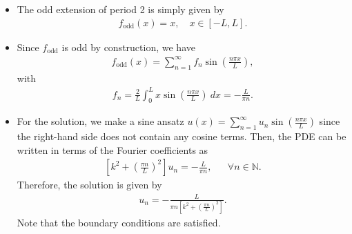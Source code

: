 \documentclass[11pt]{article}
\begin{document}
\begin{solution}
    \begin{itemize}
        \item The odd extension of period 2 is simply given by
        \begin{align*}
            f_{\mathrm{odd}}(x) = x, \quad x \in [-L,L].
        \end{align*}
        \item 
        Since $f_{\mathrm{odd}}$ is odd by construction, we have
        \begin{align*}
            f_{\mathrm{odd}}(x) = \sum_{n=1}^{\infty} f_n \sin(\frac{n \pi x}{L}),
        \end{align*}
        with
        \begin{align*}
            f_n = \frac{2}{L} \int_{0}^{L} x \sin(\frac{n \pi x}{L}) \ dx = -\frac{L}{\pi n}.
        \end{align*}
        \item For the solution, we make a sine ansatz $u(x) = \sum_{n=1}^{\infty} u_n \sin(\frac{n \pi x}{L})$ since the right-hand side does not contain any cosine terms.
        Then, the PDE can be written in terms of the Fourier coefficients as
        \begin{align*}
            \left [k^2 + \left(\frac{\pi n}{L} \right)^2 \right]u_n = -\frac{L}{\pi n}, & & \forall n \in \mathbb{N}.
        \end{align*}
        Therefore, the solution is given by
        \begin{align*}
            u_n = -\frac{L}{\pi n \left[k^2 + \left(\frac{\pi n}{L} \right)^2\right]}.
        \end{align*}
        Note that the boundary conditions are satisfied.
    \end{itemize}

\end{solution}
\end{document}
